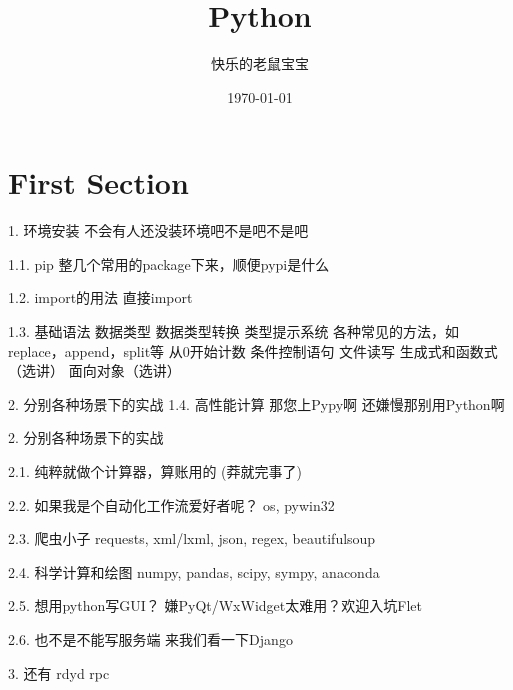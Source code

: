 \documentclass[10pt,UTF8]{ctexbeamer}
\title{Python}
\date{\today}
\author{快乐的老鼠宝宝}
\institute{长城学生网络}
\begin{document}
  \maketitle
  \section{First Section}
\begin{frame}{1. 环境安装}
不会有人还没装环境吧不是吧不是吧
\end{frame}
\begin{frame}{1.1.  pip}
整几个常用的package下来，顺便pypi是什么
\end{frame}
\begin{frame}{1.2.  import的用法}
直接import
\end{frame}
\begin{frame}{1.3. 基础语法}
数据类型
数据类型转换
类型提示系统
各种常见的方法，如replace，append，split等
从0开始计数
条件控制语句
文件读写
生成式和函数式（选讲）
面向对象（选讲）
\end{frame}
\begin{frame}{2. 分别各种场景下的实战}
1.4. 高性能计算
那您上Pypy啊
还嫌慢那别用Python啊
\end{frame}
\begin{frame}{2. 分别各种场景下的实战}
\end{frame}
\begin{frame}{2.1. 纯粹就做个计算器，算账用的}
(莽就完事了)
\end{frame}
\begin{frame}{2.2. 如果我是个自动化工作流爱好者呢？}
os, pywin32
\end{frame}
\begin{frame}{2.3. 爬虫小子}
requests, xml/lxml, json, regex, beautifulsoup
\end{frame}
\begin{frame}{2.4. 科学计算和绘图}
numpy, pandas, scipy, sympy, anaconda
\end{frame}
\begin{frame}{2.5. 想用python写GUI？}
嫌PyQt/WxWidget太难用？欢迎入坑Flet
\end{frame}
\begin{frame}{2.6. 也不是不能写服务端}
来我们看一下Django
\end{frame}
\begin{frame}{3. 还有}
    rdyd rpc
    \end{frame}
\end{document}
